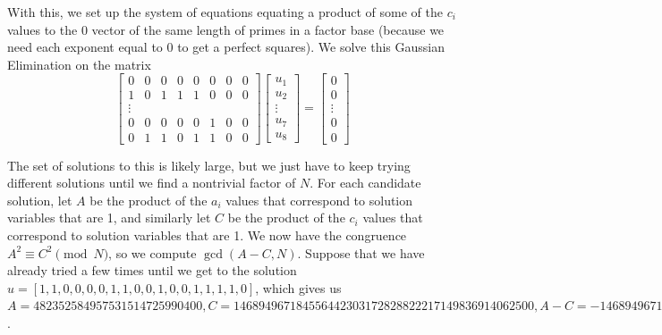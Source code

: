 \documentclass[11pt,reqno]{amsart}
\theoremstyle{definition}
\begin{document}

With this, we set up the system of equations equating a product of some of the $c_i$ values to the 0 vector of the same length of primes in a factor base (because we need each exponent equal to 0 to get a perfect squares). We solve this Gaussian Elimination on the matrix \[
      \begin{bmatrix}
         0 & 0 & 0 & 0 & 0 & 0 & 0 & 0 \\
         1 & 0 & 1 & 1 & 1 & 0 & 0 & 0 \\
         \vdots \\
         0 & 0 & 0 & 0 & 0 & 1 & 0 & 0 \\
         0 & 1 & 1 & 0 & 1 & 1 & 0 & 0
      \end{bmatrix}
      \begin{bmatrix}
         u_1 \\
         u_2 \\
         \vdots \\
         u_7 \\
         u_8
      \end{bmatrix}
      =
      \begin{bmatrix}
         0 \\
         0 \\
         \vdots \\
         0 \\
         0
      \end{bmatrix}\]

The set of solutions to this is likely large, but we just have to keep trying different solutions until we find a nontrivial factor of $N$. For each candidate solution, let $A$ be the product of the $a_i$ values that correspond to solution variables that are 1, and similarly let $C$ be the product of the $c_i$ values that correspond to solution variables that are 1. We now have the congruence $A^2 \equiv C^2 \pmod{N}$, so we compute $\gcd(A - C, N)$. Suppose that we have already tried a few times until we get to the solution $u = [1, 1, 0, 0, 0, 0, 1, 1, 0, 0, 1, 0, 0, 1, 1, 1, 1, 0]$, which gives us $A = 482352584957531514725990400, C = 146894967184556442303172828822217149836914062500, A - C = -146894967184556442302690476237259618322188072100$. 
\end{document}
